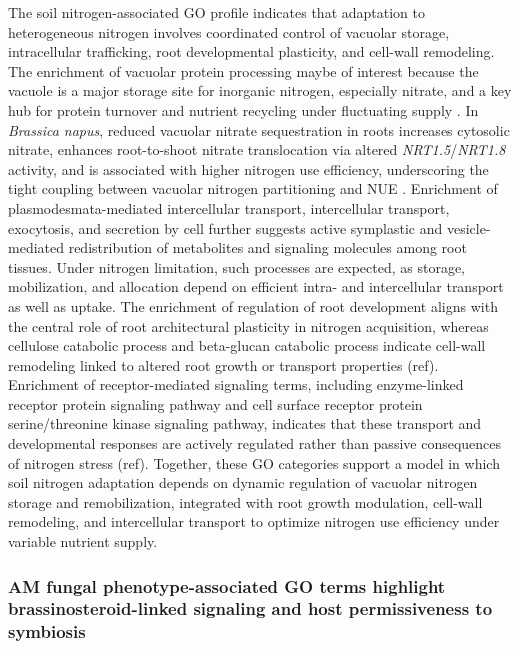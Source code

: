 \documentclass[unnumsec,webpdf,contemporary,large]{oup-authoring-template}%
\theoremstyle{thmstyleone}%
\theoremstyle{thmstyletwo}%
\theoremstyle{thmstylethree}%
\begin{document}
The soil nitrogen-associated GO profile indicates that adaptation to heterogeneous nitrogen involves coordinated control of vacuolar storage, intracellular trafficking, root developmental plasticity, and cell-wall remodeling. The enrichment of vacuolar protein processing maybe of interest because the vacuole is a major storage site for inorganic nitrogen, especially nitrate, and a key hub for protein turnover and nutrient recycling under fluctuating supply \citep{Martinoia2007, Han2016}. In \textit{Brassica napus}, reduced vacuolar nitrate sequestration in roots increases cytosolic nitrate, enhances root-to-shoot nitrate translocation via altered \textit{NRT1.5}/\textit{NRT1.8} activity, and is associated with higher nitrogen use efficiency, underscoring the tight coupling between vacuolar nitrogen partitioning and NUE \citep{Han2016}. Enrichment of plasmodesmata-mediated intercellular transport, intercellular transport, exocytosis, and secretion by cell further suggests active symplastic and vesicle-mediated redistribution of metabolites and signaling molecules among root tissues. Under nitrogen limitation, such processes are expected, as storage, mobilization, and allocation depend on efficient intra- and intercellular transport as well as uptake. The enrichment of regulation of root development aligns with the central role of root architectural plasticity in nitrogen acquisition, whereas cellulose catabolic process and beta-glucan catabolic process indicate cell-wall remodeling linked to altered root growth or transport properties (ref). Enrichment of receptor-mediated signaling terms, including enzyme-linked receptor protein signaling pathway and cell surface receptor protein serine/threonine kinase signaling pathway, indicates that these transport and developmental responses are actively regulated rather than passive consequences of nitrogen stress (ref). Together, these GO categories support a model in which soil nitrogen adaptation depends on dynamic regulation of vacuolar nitrogen storage and remobilization, integrated with root growth modulation, cell-wall remodeling, and intercellular transport to optimize nitrogen use efficiency under variable nutrient supply.


\subsubsection{AM fungal phenotype-associated GO terms highlight brassinosteroid-linked signaling and host permissiveness to symbiosis}
\end{document}
